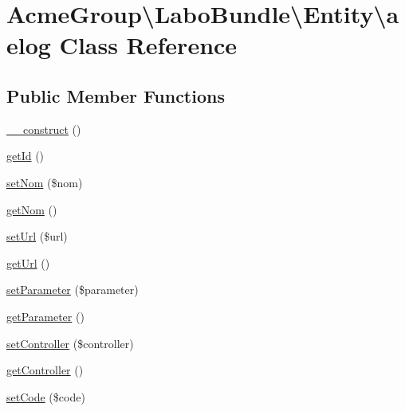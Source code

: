 \hypertarget{class_acme_group_1_1_labo_bundle_1_1_entity_1_1aelog}{\section{Acme\+Group\textbackslash{}Labo\+Bundle\textbackslash{}Entity\textbackslash{}aelog Class Reference}
\label{class_acme_group_1_1_labo_bundle_1_1_entity_1_1aelog}
}
\subsection*{Public Member Functions}
\begin{DoxyCompactItemize}
\item 
\hyperlink{class_acme_group_1_1_labo_bundle_1_1_entity_1_1aelog_af84bdeb26bc8edb06910fde467b82ce3}{\+\_\+\+\_\+construct} ()
\item 
\hyperlink{class_acme_group_1_1_labo_bundle_1_1_entity_1_1aelog_ac271807fc2e6fa6ea26a913224c19b30}{get\+Id} ()
\item 
\hyperlink{class_acme_group_1_1_labo_bundle_1_1_entity_1_1aelog_aed957a52d34398465f59c617d9c2199c}{set\+Nom} (\$nom)
\item 
\hyperlink{class_acme_group_1_1_labo_bundle_1_1_entity_1_1aelog_aa6a82b9f2bb5e93c4e290f97655a2c86}{get\+Nom} ()
\item 
\hyperlink{class_acme_group_1_1_labo_bundle_1_1_entity_1_1aelog_a73d8bb64c8458a9ed94a47518374aaad}{set\+Url} (\$url)
\item 
\hyperlink{class_acme_group_1_1_labo_bundle_1_1_entity_1_1aelog_a632ef98bb3dba4a16d3ae675f08ab2b2}{get\+Url} ()
\item 
\hyperlink{class_acme_group_1_1_labo_bundle_1_1_entity_1_1aelog_ae4596da9a24d7ad03aa9815275110e69}{set\+Parameter} (\$parameter)
\item 
\hyperlink{class_acme_group_1_1_labo_bundle_1_1_entity_1_1aelog_a0cd4025b0fb1639492814c99f925ebbb}{get\+Parameter} ()
\item 
\hyperlink{class_acme_group_1_1_labo_bundle_1_1_entity_1_1aelog_ac7e38cb3bb0bbe9b5265592f5c318964}{set\+Controller} (\$controller)
\item 
\hyperlink{class_acme_group_1_1_labo_bundle_1_1_entity_1_1aelog_ada84c713e51fcb5edf258db0beb63eb0}{get\+Controller} ()
\item 
\hyperlink{class_acme_group_1_1_labo_bundle_1_1_entity_1_1aelog_aa7d39c3681655a79e58107121ee6f7ec}{set\+Code} (\$code)

\end{DoxyCompactItemize}
